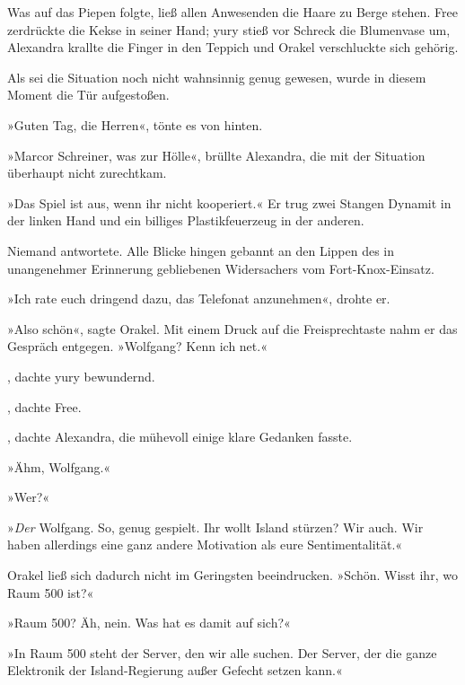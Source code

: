 Was auf das Piepen folgte, ließ allen Anwesenden die Haare zu Berge stehen. Free zerdrückte die Kekse in seiner Hand; yury stieß vor Schreck die Blumenvase um, Alexandra krallte die Finger in den Teppich und Orakel verschluckte sich gehörig.


Als sei die Situation noch nicht wahnsinnig genug gewesen, wurde in diesem Moment die Tür aufgestoßen.

»Guten Tag, die Herren«, tönte es von hinten.

»Marcor Schreiner, was zur Hölle«, brüllte Alexandra, die mit der Situation überhaupt nicht zurechtkam.

»Das Spiel ist aus, wenn ihr nicht kooperiert.« Er trug zwei Stangen Dynamit in der linken Hand und ein billiges Plastikfeuerzeug in der anderen.

Niemand antwortete. Alle Blicke hingen gebannt an den Lippen des in unangenehmer Erinnerung gebliebenen Widersachers vom Fort-Knox-Einsatz.

»Ich rate euch dringend dazu, das Telefonat anzunehmen«, drohte er.

»Also schön«, sagte Orakel. Mit einem Druck auf die Freisprechtaste nahm er das Gespräch entgegen. »Wolfgang? Kenn ich net.«

, dachte yury bewundernd.

, dachte Free.

, dachte Alexandra, die mühevoll einige klare Gedanken fasste. 

»Ähm, Wolfgang.«

»Wer?«

»\emph{Der} Wolfgang. So, genug gespielt. Ihr wollt Island stürzen? Wir auch. Wir haben allerdings eine ganz andere Motivation als eure Sentimentalität.«

Orakel ließ sich dadurch nicht im Geringsten beeindrucken. »Schön. Wisst ihr, wo Raum 500 ist?«

»Raum 500? Äh, nein. Was hat es damit auf sich?«

»In Raum 500 steht der Server, den wir alle suchen. Der Server, der die ganze Elektronik der Island-Regierung außer Gefecht setzen kann.«

